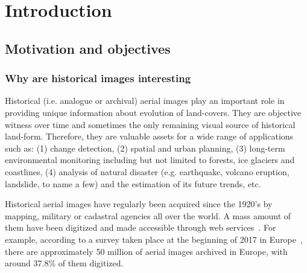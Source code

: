 
\chapter{Introduction}
\label{chap:intro}
\minitoc

\section{Motivation and objectives}
\subsection{Why are historical images interesting}
Historical (i.e. analogue or archival) aerial images play an important role in providing unique information about evolution of land-covers. 
They are objective witness over time and sometimes the only remaining visual source of historical land-form. Therefore, they are valuable assets for a wide range of applications such as: (1) change detection, (2) spatial and urban planning, (3) long-term environmental monitoring including but not limited to forests, ice glaciers and coastlines, (4) analysis of natural disaster (e.g. earthquake, volcano eruption, landslide, to name a few) and the estimation of its future trends, etc.
\par
Historical aerial images have regularly been acquired since the 1920’s by mapping, military or cadastral agencies all over the world. A mass amount of them have been digitized and made accessible through web services~\cite{sebastien2019archiving,earthexplorer,remonterletemps}. 
For example, according to a survey taken place at the beginning of 2017 in Europe~\cite{sebastien2019archiving}, there are approximately 50 million of aerial images archived in Europe, with around 37.8\% of them digitized.
